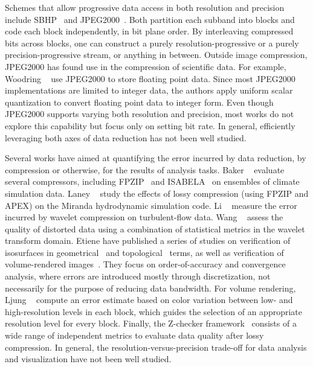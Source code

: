 Schemes that allow progressive data access in both resolution and precision include
SBHP~\cite{sbhp2000} and JPEG2000~\cite{jpeg2000}. Both partition each subband into blocks and code
each block independently, in bit plane order. By interleaving compressed bits across blocks, one can
construct a purely resolution-progressive or a purely precision-progressive stream, or anything in
between. Outside image compression, JPEG2000 has found use in the compression of scientific data.
For example, Woodring \etal~\cite{woodring2011} use JPEG2000 to store floating point data. Since
most JPEG2000 implementations are limited to integer data, the authors apply uniform scalar
quantization to convert floating point data to integer form. Even though JPEG2000 supports varying
both resolution and precision, most works do not explore this capability but focus only on setting
bit rate. In general, efficiently leveraging both axes of data reduction has not been well studied.

Several works have aimed at quantifying the error incurred by data reduction, by compression or
otherwise, for the results of analysis tasks. Baker \etal~\cite{evaluating-compression-climate}
evaluate several compressors, including FPZIP~\cite{fpzip} and ISABELA~\cite{isabela} on ensembles
of climate simulation data. Laney \etal~\cite{compression_sim2013} study the effects of lossy
compression (using FPZIP and APEX) on the Miranda hydrodynamic simulation code. Li
\etal~\cite{evaluating-efficacy-wavelet} measure the error incurred by wavelet compression on
turbulent-flow data. Wang \etal~\cite{statistical-volume-quality} assess the quality of distorted
data using a combination of statistical metrics in the wavelet transform domain. Etiene \etal have
published a series of studies on verification of isosurfaces in
geometrical~\cite{verifiable-isosurface} and topological~\cite{topology-verification-isosurface}
terms, as well as verification of volume-rendered images~\cite{verifying-volume-rendering}. They
focus on order-of-accuracy and convergence analysis, where errors are introduced mostly through
discretization, not necessarily for the purpose of reducing data bandwidth. For volume rendering,
Ljung \etal~\cite{transfer-function-based} compute an error estimate based on color variation
between low- and high-resolution levels in each block, which guides the selection of an appropriate
resolution level for every block. Finally, the Z-checker framework~\cite{z-checker} consists of a
wide range of independent metrics to evaluate data quality after lossy compression. In general, the
resolution-versus-precision trade-off for data analysis and visualization have not been well
studied.

